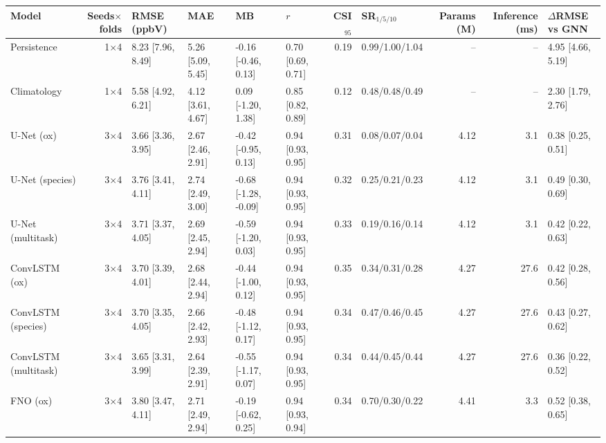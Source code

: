 \begin{table}[t]
\centering\small
\begin{tabular}{lrllllrlrrl}
\toprule
Model & Seeds$\times$folds & RMSE (ppbV) & MAE & MB & $r$ & CSI$_{95}$ & SR$_{1/5/10}$ & Params (M) & Inference (ms) & $\Delta$RMSE vs GNN \\
\midrule
Persistence & 1$\times$4 & 8.23 \scriptsize[7.96, 8.49] & 5.26 \scriptsize[5.09, 5.45] & -0.16 \scriptsize[-0.46, 0.13] & 0.70 \scriptsize[0.69, 0.71] & 0.19 & 0.99/1.00/1.04 & -- & -- & 4.95 \scriptsize[4.66, 5.19] \\
Climatology & 1$\times$4 & 5.58 \scriptsize[4.92, 6.21] & 4.12 \scriptsize[3.61, 4.67] & 0.09 \scriptsize[-1.20, 1.38] & 0.85 \scriptsize[0.82, 0.89] & 0.12 & 0.48/0.48/0.49 & -- & -- & 2.30 \scriptsize[1.79, 2.76] \\
\midrule
U-Net (ox) & 3$\times$4 & 3.66 \scriptsize[3.36, 3.95] & 2.67 \scriptsize[2.46, 2.91] & -0.42 \scriptsize[-0.95, 0.13] & 0.94 \scriptsize[0.93, 0.95] & 0.31 & 0.08/0.07/0.04 & 4.12 & 3.1 & 0.38 \scriptsize[0.25, 0.51] \\
U-Net (species) & 3$\times$4 & 3.76 \scriptsize[3.41, 4.11] & 2.74 \scriptsize[2.49, 3.00] & -0.68 \scriptsize[-1.28, -0.09] & 0.94 \scriptsize[0.93, 0.95] & 0.32 & 0.25/0.21/0.23 & 4.12 & 3.1 & 0.49 \scriptsize[0.30, 0.69] \\
U-Net (multitask) & 3$\times$4 & 3.71 \scriptsize[3.37, 4.05] & 2.69 \scriptsize[2.45, 2.94] & -0.59 \scriptsize[-1.20, 0.03] & 0.94 \scriptsize[0.93, 0.95] & 0.33 & 0.19/0.16/0.14 & 4.12 & 3.1 & 0.42 \scriptsize[0.22, 0.63] \\
ConvLSTM (ox) & 3$\times$4 & 3.70 \scriptsize[3.39, 4.01] & 2.68 \scriptsize[2.44, 2.94] & -0.44 \scriptsize[-1.00, 0.12] & 0.94 \scriptsize[0.93, 0.95] & 0.35 & 0.34/0.31/0.28 & 4.27 & 27.6 & 0.42 \scriptsize[0.28, 0.56] \\
ConvLSTM (species) & 3$\times$4 & 3.70 \scriptsize[3.35, 4.05] & 2.66 \scriptsize[2.42, 2.93] & -0.48 \scriptsize[-1.12, 0.17] & 0.94 \scriptsize[0.93, 0.95] & 0.34 & 0.47/0.46/0.45 & 4.27 & 27.6 & 0.43 \scriptsize[0.27, 0.62] \\
ConvLSTM (multitask) & 3$\times$4 & 3.65 \scriptsize[3.31, 3.99] & 2.64 \scriptsize[2.39, 2.91] & -0.55 \scriptsize[-1.17, 0.07] & 0.94 \scriptsize[0.93, 0.95] & 0.34 & 0.44/0.45/0.44 & 4.27 & 27.6 & 0.36 \scriptsize[0.22, 0.52] \\
FNO (ox) & 3$\times$4 & 3.80 \scriptsize[3.47, 4.11] & 2.71 \scriptsize[2.49, 2.94] & -0.19 \scriptsize[-0.62, 0.25] & 0.94 \scriptsize[0.93, 0.94] & 0.34 & 0.70/0.30/0.22 & 4.41 & 3.3 & 0.52 \scriptsize[0.38, 0.65] \\

\end{tabular}
\end{table}
